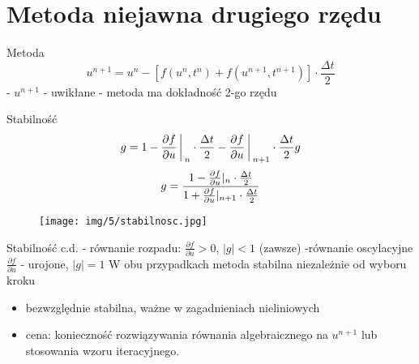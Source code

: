 \section{Metoda niejawna drugiego rzędu}
\begin{frame}{Metoda}
	$$u^{n+1} = u^n - [f(u^n,t^n)+f(u^{n+1},t^{n+1})]\cdot \frac{\Delta t}{2}$$
    \newline
    - $u^{n+1}$ - uwikłane
    \newline
    - metoda ma dokładność 2-go rzędu
\end{frame}
\begin{frame}{Stabilność}
	$$g = 1-\frac{\partial f}{\partial u}\bigg\arrowvert_n \cdot\frac{\Delta t}{2}-\frac{\partial f}{\partial u}\bigg\arrowvert_{n+1}\cdot \frac{\Delta t}{2} g$$
	$$g=\frac{1-\frac{\partial f}{\partial u}\arrowvert_n \cdot \frac{\Delta t}{2}}{1+\frac{\partial f}{\partial u}\arrowvert_{n+1} \cdot \frac{\Delta t}{2}}$$
    \begin{figure}
    	\texttt{[image: img/5/stabilnosc.jpg]}
    \end{figure}
\end{frame}
\begin{frame}{Stabilność c.d.}
	- równanie rozpadu: $\frac{\partial f}{\partial u} > 0$, \quad $|g| < 1$ (zawsze)
    \newline
    -równanie oscylacyjne $\frac{\partial f}{\partial u}$ - urojone, $|g| = 1$
    \newline\newline
    W obu przypadkach metoda stabilna niezależnie od wyboru kroku
    \begin{itemize}
      \item bezwzględnie stabilna, ważne w zagadnieniach nieliniowych
      \item cena: konieczność rozwiązywania równania algebraicznego na $u^{n+1}$ lub stosowania wzoru iteracyjnego.
    \end{itemize}
\end{frame}
